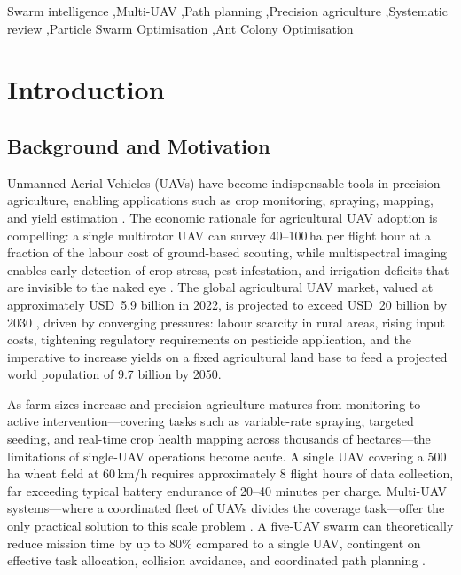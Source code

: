 \documentclass[review,3p,times]{elsarticle}
\begin{document}
\begin{frontmatter}
\begin{keyword}
Swarm intelligence \sep Multi-UAV \sep Path planning \sep Precision agriculture \sep Systematic review \sep Particle Swarm Optimisation \sep Ant Colony Optimisation
\end{keyword}

\end{frontmatter}

\section{Introduction}

\subsection{Background and Motivation}

Unmanned Aerial Vehicles (UAVs) have become indispensable tools in precision agriculture, enabling applications such as crop monitoring, spraying, mapping, and yield estimation \cite{zhang2012,tsouros2019,puri2017,mogili2018,hunt2018}. The economic rationale for agricultural UAV adoption is compelling: a single multirotor UAV can survey 40--100\,ha per flight hour at a fraction of the labour cost of ground-based scouting, while multispectral imaging enables early detection of crop stress, pest infestation, and irrigation deficits that are invisible to the naked eye \cite{hunt2018,zhang2012}. The global agricultural UAV market, valued at approximately USD~5.9 billion in 2022, is projected to exceed USD~20 billion by 2030 \cite{tsouros2019,mogili2018}, driven by converging pressures: labour scarcity in rural areas, rising input costs, tightening regulatory requirements on pesticide application, and the imperative to increase yields on a fixed agricultural land base to feed a projected world population of 9.7 billion by 2050.

As farm sizes increase and precision agriculture matures from monitoring to active intervention---covering tasks such as variable-rate spraying, targeted seeding, and real-time crop health mapping across thousands of hectares---the limitations of single-UAV operations become acute. A single UAV covering a 500\,ha wheat field at 60\,km/h requires approximately 8 flight hours of data collection, far exceeding typical battery endurance of 20--40 minutes per charge. Multi-UAV systems---where a coordinated fleet of UAVs divides the coverage task---offer the only practical solution to this scale problem \cite{chung2018,gupta2016}. A five-UAV swarm can theoretically reduce mission time by up to 80\% compared to a single UAV, contingent on effective task allocation, collision avoidance, and coordinated path planning \cite{chung2018}.
\end{document}
